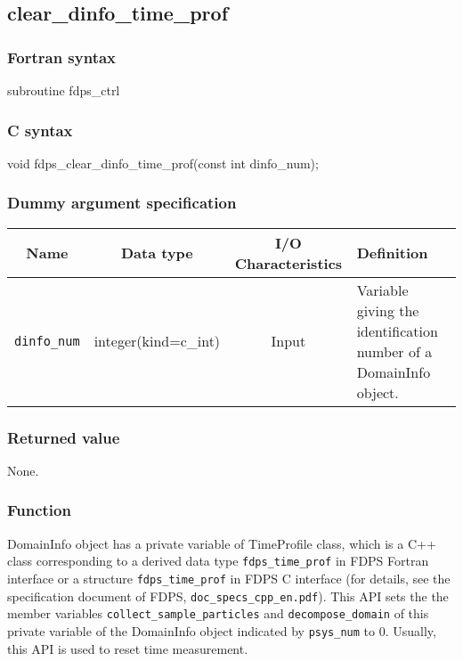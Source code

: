 \clearpage

\subsection{clear\_dinfo\_time\_prof}
\subsubsection*{Fortran syntax}
\begin{screen}
\begin{spverbatim}
subroutine fdps_ctrl%
\end{spverbatim}
\end{screen}

\subsubsection*{C syntax}
\begin{screen}
\begin{spverbatim}
void fdps_clear_dinfo_time_prof(const int dinfo_num);
\end{spverbatim}
\end{screen}

\subsubsection*{Dummy argument specification}
\begin{table}[h]
\begin{tabularx}{\linewidth}{cccX}
\toprule
\rowcolor{Snow2}
Name & Data type & I/O Characteristics & Definition \\
\midrule
\texttt{dinfo\_num} & integer(kind=c\_int) & Input & Variable giving the identification number of a DomainInfo object.\\
\bottomrule
\end{tabularx}
\end{table}

\subsubsection*{Returned value}
None.

\subsubsection*{Function}
DomainInfo object has a private variable of TimeProfile class, which is a C++ class corresponding to a derived data type \texttt{fdps\_time\_prof} in FDPS Fortran interface or a structure \texttt{fdps\_time\_prof} in FDPS C interface (for details, see the specification document of FDPS, \texttt{doc\_specs\_cpp\_en.pdf}). This API sets the the member variables \texttt{collect\_sample\_particles} and \texttt{decompose\_domain} of this private variable of the DomainInfo object indicated by \texttt{psys\_num} to 0. Usually, this API is used to reset time measurement.

